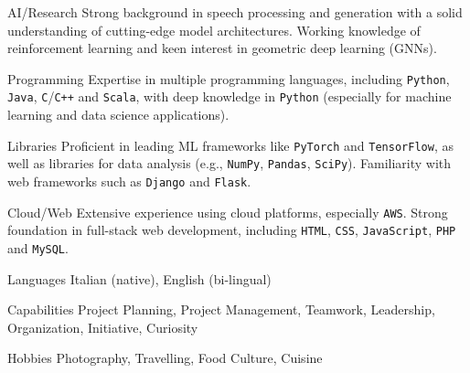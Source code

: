 

\begin{cvskills}
  \cvskill
    {AI/Research}
    {Strong background in speech processing and generation with a solid understanding of cutting-edge model architectures. Working knowledge of reinforcement learning and keen interest in geometric deep learning (GNNs).}
  
  \cvskill
    {Programming}
    {Expertise in multiple programming languages, including \texttt{Python}, \texttt{Java}, \texttt{C}/\texttt{C++} and \texttt{Scala}, with deep knowledge in \texttt{Python} (especially for machine learning and data science applications).}

  \cvskill
    {Libraries}
    {Proficient in leading ML frameworks like \texttt{PyTorch} and \texttt{TensorFlow}, as well as libraries for data analysis (e.g., \texttt{NumPy}, \texttt{Pandas}, \texttt{SciPy}). Familiarity with web frameworks such as \texttt{Django} and \texttt{Flask}.}

  \cvskill
    {Cloud/Web}
    {Extensive experience using cloud platforms, especially \texttt{AWS}. Strong foundation in full-stack web development, including \texttt{HTML}, \texttt{CSS}, \texttt{JavaScript}, \texttt{PHP} and \texttt{MySQL}.}
\end{cvskills}



\begin{cvskills}
  \hspace{4.0mm}
  \cvskill
    {Languages}
    {Italian (native), English (bi-lingual)}
  
  \cvskill
    {Capabilities}
    {Project Planning, Project Management, Teamwork, Leadership, Organization, Initiative, Curiosity}

  \cvskill
    {Hobbies}
    {Photography, Travelling, Food Culture, Cuisine}
\end{cvskills}
